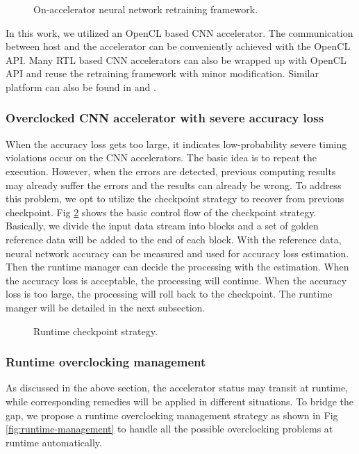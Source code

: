 \begin{figure}
    \caption{On-accelerator neural network retraining framework.}
\label{fig:retrain}
\vspace{-1em}
\end{figure}

In this work, we utilized an OpenCL based CNN accelerator. The communication between 
host and the accelerator can be conveniently achieved with the OpenCL API. 
Many RTL based CNN accelerators can also be wrapped up with 
OpenCL API and reuse the retraining framework with minor modification.
Similar platform can also be found in \cite{Caffeine_6} and \cite{DiCecco_4}.

\subsubsection{Overclocked CNN accelerator with severe accuracy loss}
When the accuracy loss gets too large, it indicates low-probability severe timing 
violations occur on the CNN accelerators. The basic idea is to repeat the execution. 
However, when the errors are detected, previous computing results may already suffer 
the errors and the results can already be wrong. To address this problem, we opt to 
utilize the checkpoint strategy to recover from previous checkpoint. 
Fig \ref{fig:loss_checkpoint} shows the basic control flow of the checkpoint strategy.
Basically, we divide the input data stream into blocks and a set of golden reference data 
will be added to the end of each block. With the reference data, neural network accuracy 
can be measured and used for accuracy loss estimation. Then the runtime manager 
can decide the processing with the estimation. When the accuracy loss is acceptable, 
the processing will continue. When the accuracy loss is too large, the processing 
will roll back to the checkpoint. The runtime manger will be detailed 
in the next subsection. 

\begin{figure}
    \caption{Runtime checkpoint strategy.}
\label{fig:loss_checkpoint}
\vspace{-1em}
\end{figure}

\subsubsection{Runtime overclocking management}
As discussed in the above section, the accelerator status may transit at runtime, 
while corresponding remedies will be applied in different situations. To bridge the 
gap, we propose a runtime overclocking management strategy as shown in 
Fig \ref{fig:runtime-management} to handle all the possible overclocking problems 
at runtime automatically.

